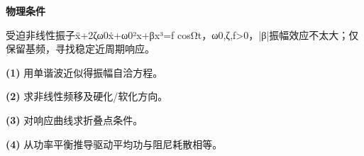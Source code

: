 \textbf{物理条件}\par 受迫非线性振子ẍ+2ζω0ẋ+ω0²x+βx³=f cosΩt，ω0,ζ,f>0，|β|振幅效应不太大；仅保留基频，寻找稳定近周期响应。
\par\noindent\textbf{(1)} 用单谐波近似得振幅自洽方程。
\par\noindent\textbf{(2)} 求非线性频移及硬化/软化方向。
\par\noindent\textbf{(3)} 对响应曲线求折叠点条件。
\par\noindent\textbf{(4)} 从功率平衡推导驱动平均功与阻尼耗散相等。
